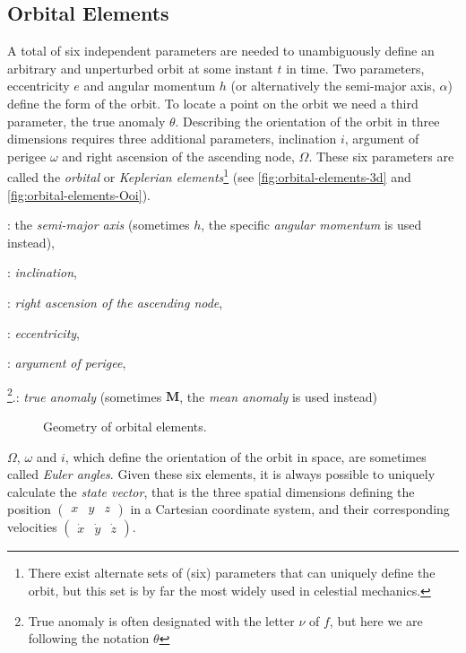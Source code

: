 \subsection{Orbital Elements}\label{ssec:orbital-elements}

A total of six independent parameters are needed to unambiguously define an 
arbitrary and unperturbed orbit at some instant $t$ in time. Two parameters, 
eccentricity $e$ and angular momentum $h$ (or alternatively the semi-major axis, 
$\alpha$) define the form of the orbit. To locate a point on the orbit we need a 
third parameter, the true anomaly $\theta$. Describing the orientation of the 
orbit in three dimensions requires three additional parameters, inclination $i$, 
argument of perigee $\omega$ and right ascension of the ascending node, $\Omega$. 
These six parameters are called the \emph{orbital} or 
\emph{Keplerian elements}\footnote{There exist alternate sets of (six) parameters 
that can uniquely define the orbit, but this set is by far the most widely used 
in celestial mechanics.} (see \autoref{fig:orbital-elements-3d} and 
\autoref{fig:orbital-elements-Ooi}).
\begin{description}[labelindent=1cm]
  \item[$\alpha$]: the \emph{semi-major axis} (sometimes $h$, the specific 
    \emph{angular momentum} is used instead),
  \item[$i$]: \emph{inclination},
  \item[$\Omega$]: \emph{right ascension of the ascending node},
  \item[$e$]: \emph{eccentricity},
  \item[$\omega$]: \emph{argument of perigee},
  \item[$\theta$]\footnote{True anomaly is often designated with the letter 
    $\nu$ of $f$, but here we are following the notation $\theta$}.: 
    \emph{true anomaly} (sometimes $\bm{M}$, the \emph{mean anomaly} 
    is used instead)
\end{description}

\begin{figure}
  \centering
  
  \caption{Geometry of orbital elements.}
  \label{fig:orbital-elements-3d}
\end{figure}

$\Omega$, $\omega$ and $i$, which define the orientation of the orbit in space, 
are sometimes called \emph{Euler angles}. Given these six elements, it is always 
possible to uniquely calculate the \emph{state vector}, that is the three spatial 
dimensions defining the position $\begin{pmatrix}x&y&z\end{pmatrix}$ in a Cartesian 
coordinate system, and their corresponding velocities 
$\begin{pmatrix}\dot{x}&\dot{y}&\dot{z}\end{pmatrix}$.

